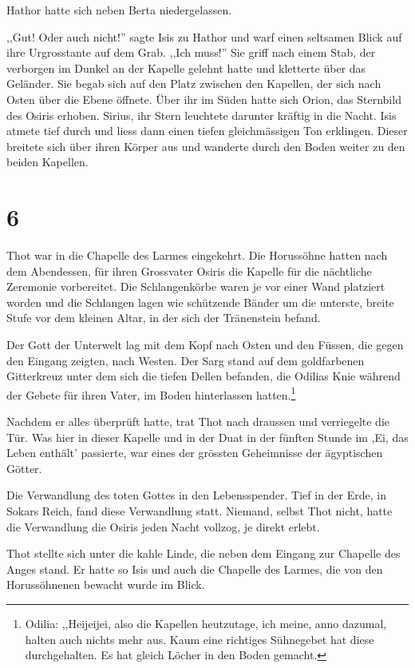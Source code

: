 \documentclass[11pt,titlepage,a5paper]{book}
\begin{document}
Hathor hatte sich neben Berta niedergelassen.

,,Gut! Oder auch nicht!'' sagte Isis zu Hathor und warf einen seltsamen Blick auf ihre Urgrosstante auf dem Grab. ,,Ich muss!'' Sie griff nach einem Stab, der verborgen im Dunkel an der Kapelle gelehnt hatte und kletterte über das Geländer. Sie begab sich auf den Platz zwischen den Kapellen, der sich nach Osten über die Ebene öffnete. Über ihr im Süden hatte sich Orion, das Sternbild des Osiris erhoben. Sirius, ihr Stern leuchtete darunter kräftig in die Nacht. Isis atmete tief durch und liess dann einen tiefen gleichmässigen Ton erklingen. Dieser breitete sich über ihren Körper aus und wanderte durch den Boden weiter zu den beiden Kapellen.

\section*{6}

Thot war in die Chapelle des Larmes eingekehrt. Die Horussöhne hatten nach dem Abendessen, für ihren Grossvater Osiris die Kapelle für die nächtliche Zeremonie vorbereitet. Die Schlangenkörbe waren je vor einer Wand platziert worden und die Schlangen lagen wie schützende Bänder um die unterste, breite Stufe vor dem kleinen Altar, in der sich der Tränenstein befand. 

Der Gott der Unterwelt lag mit dem Kopf nach Osten und den Füssen, die gegen den Eingang zeigten, nach Westen. Der Sarg stand auf dem goldfarbenen Gitterkreuz unter dem sich die tiefen Dellen befanden, die Odilias Knie während der Gebete für ihren Vater, im Boden hinterlassen hatten.\footnote{Odilia: ,,Heijeijei, also die Kapellen  heutzutage, ich meine, anno dazumal, halten auch nichts mehr aus. Kaum eine richtiges Sühnegebet hat diese durchgehalten. Es hat gleich Löcher in den Boden gemacht.}

Nachdem er alles überprüft hatte, trat Thot nach draussen und verriegelte die Tür. Was hier in dieser Kapelle und in der Duat in der fünften Stunde im ,Ei, das Leben enthält' passierte, war eines der grössten Geheimnisse der ägyptischen Götter.

Die Verwandlung des toten Gottes in den Lebensspender. Tief in der Erde, in Sokars Reich, fand diese Verwandlung statt. Niemand, selbst Thot nicht, hatte die Verwandlung die Osiris jeden Nacht vollzog, je direkt erlebt. 

Thot stellte sich unter die kahle Linde, die neben dem Eingang zur Chapelle des Anges stand. Er hatte so Isis und auch die Chapelle des Larmes, die von den Horussöhnenen bewacht wurde im Blick.
\end{document}
